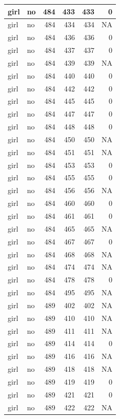 \documentclass[man]{apa6}
\begin{document}
\begin{tabular}{l|l|r|r|r|r}
\hline
girl & no & 484 & 433 & 433 & 0\\
\hline
girl & no & 484 & 434 & 434 & NA\\
\hline
girl & no & 484 & 436 & 436 & 0\\
\hline
girl & no & 484 & 437 & 437 & 0\\
\hline
girl & no & 484 & 439 & 439 & NA\\
\hline
girl & no & 484 & 440 & 440 & 0\\
\hline
girl & no & 484 & 442 & 442 & 0\\
\hline
girl & no & 484 & 445 & 445 & 0\\
\hline
girl & no & 484 & 447 & 447 & 0\\
\hline
girl & no & 484 & 448 & 448 & 0\\
\hline
girl & no & 484 & 450 & 450 & NA\\
\hline
girl & no & 484 & 451 & 451 & NA\\
\hline
girl & no & 484 & 453 & 453 & 0\\
\hline
girl & no & 484 & 455 & 455 & 0\\
\hline
girl & no & 484 & 456 & 456 & NA\\
\hline
girl & no & 484 & 460 & 460 & 0\\
\hline
girl & no & 484 & 461 & 461 & 0\\
\hline
girl & no & 484 & 465 & 465 & NA\\
\hline
girl & no & 484 & 467 & 467 & 0\\
\hline
girl & no & 484 & 468 & 468 & NA\\
\hline
girl & no & 484 & 474 & 474 & NA\\
\hline
girl & no & 484 & 478 & 478 & 0\\
\hline
girl & no & 484 & 495 & 495 & NA\\
\hline
girl & no & 489 & 402 & 402 & NA\\
\hline
girl & no & 489 & 410 & 410 & NA\\
\hline
girl & no & 489 & 411 & 411 & NA\\
\hline
girl & no & 489 & 414 & 414 & 0\\
\hline
girl & no & 489 & 416 & 416 & NA\\
\hline
girl & no & 489 & 418 & 418 & NA\\
\hline
girl & no & 489 & 419 & 419 & 0\\
\hline
girl & no & 489 & 421 & 421 & 0\\
\hline
girl & no & 489 & 422 & 422 & NA\\

\end{tabular}
\end{document}
